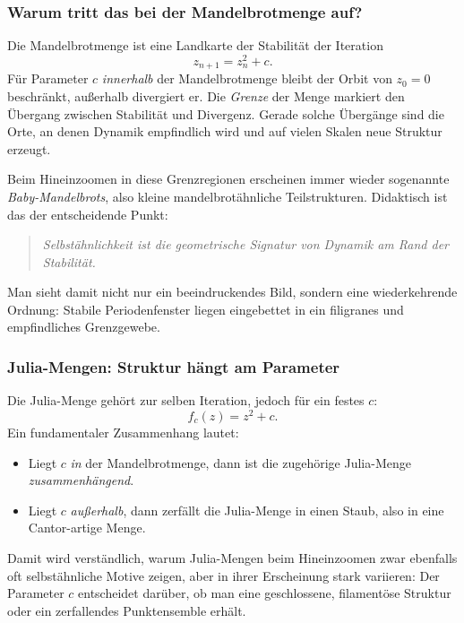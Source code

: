 \subsubsection*{Warum tritt das bei der Mandelbrotmenge auf?}

Die Mandelbrotmenge ist eine Landkarte der Stabilität der Iteration
\[
z_{n+1}=z_n^2+c.
\]
Für Parameter $c$ \emph{innerhalb} der Mandelbrotmenge bleibt der Orbit von $z_0=0$ beschränkt,
außerhalb divergiert er.
Die \emph{Grenze} der Menge markiert den Übergang zwischen Stabilität und Divergenz.
Gerade solche Übergänge sind die Orte,
an denen Dynamik empfindlich wird
und auf vielen Skalen neue Struktur erzeugt.

Beim Hineinzoomen in diese Grenzregionen erscheinen immer wieder sogenannte \emph{Baby-Mandelbrots},
also kleine mandelbrotähnliche Teilstrukturen.
Didaktisch ist das der entscheidende Punkt:

\begin{quote}
\emph{Selbstähnlichkeit ist die geometrische Signatur von Dynamik am Rand der Stabilität.}
\end{quote}

Man sieht damit nicht nur ein beeindruckendes Bild,
sondern eine wiederkehrende Ordnung:
Stabile Periodenfenster liegen eingebettet
in ein filigranes und empfindliches Grenzgewebe.

\subsubsection*{Julia-Mengen: Struktur hängt am Parameter}

Die Julia-Menge gehört zur selben Iteration,
jedoch für ein festes $c$:
\[
f_c(z)=z^2+c.
\]
Ein fundamentaler Zusammenhang lautet:

\begin{itemize}
\item Liegt $c$ \emph{in} der Mandelbrotmenge, dann ist die zugehörige Julia-Menge \emph{zusammenhängend}.
\item Liegt $c$ \emph{außerhalb}, dann zerfällt die Julia-Menge in einen \glqq Staub\grqq, also in eine Cantor-artige Menge.
\end{itemize}

Damit wird verständlich,
warum Julia-Mengen beim Hineinzoomen zwar ebenfalls oft selbstähnliche Motive zeigen,
aber in ihrer Erscheinung stark variieren:
Der Parameter $c$ entscheidet darüber,
ob man eine geschlossene, filamentöse Struktur
oder ein zerfallendes Punktensemble erhält.

